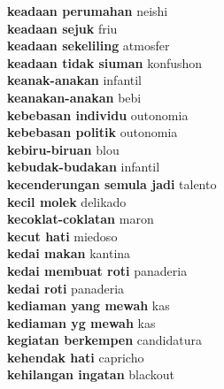 \textbf{ keadaan perumahan  } neishi \\
\textbf{ keadaan sejuk  } friu \\
\textbf{ keadaan sekeliling  } atmosfer \\
\textbf{ keadaan tidak siuman  } konfushon \\
\textbf{ keanak-anakan  } infantil \\
\textbf{ keanakan-anakan  } bebi \\
\textbf{ kebebasan individu  } outonomia \\
\textbf{ kebebasan politik  } outonomia \\
\textbf{ kebiru-biruan  } blou \\
\textbf{ kebudak-budakan  } infantil \\
\textbf{ kecenderungan semula jadi  } talento \\
\textbf{ kecil molek  } delikado \\
\textbf{ kecoklat-coklatan  } maron \\
\textbf{ kecut hati  } miedoso \\
\textbf{ kedai makan  } kantina \\
\textbf{ kedai membuat roti  } panaderia \\
\textbf{ kedai roti  } panaderia \\
\textbf{ kediaman yang mewah  } kas \\
\textbf{ kediaman yg mewah  } kas \\
\textbf{ kegiatan berkempen  } candidatura \\
\textbf{ kehendak hati  } capricho \\
\textbf{ kehilangan ingatan  } blackout \\

